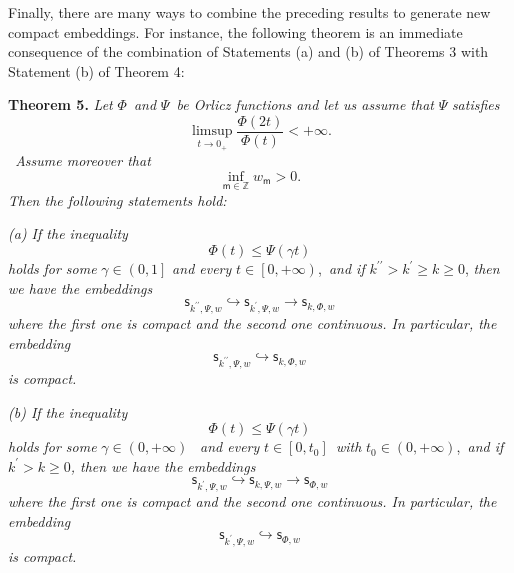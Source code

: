 \documentclass{article}
\begin{document}
\bigskip

Finally, there are many ways to combine the preceding results to generate
new compact embeddings. For instance, the following theorem is an immediate
consequence of the combination of Statements (a) and (b) of Theorems 3 with
Statement (b) of Theorem 4:

\bigskip

\textbf{Theorem 5. }\textit{Let }$\Phi $\textit{\ and }$\Psi $\textit{\ be
Orlicz functions and let us assume that }$\Psi $ \textit{satisfies}%
\begin{equation*}
\limsup_{t\rightarrow 0_{+}}\frac{\Phi \left( 2t\right) }{\Phi \left(
t\right) }<+\infty .
\end{equation*}%
\textit{\ Assume moreover that}%
\begin{equation*}
\inf_{\mathsf{m}\in \mathbb{Z}}w_{\mathsf{m}}>0\text{.}
\end{equation*}%
\textit{Then the following statements hold:}

\textit{(a) If the inequality}%
\begin{equation*}
\Phi (t)\leq \Psi (\gamma t)
\end{equation*}%
\textit{holds} \textit{for some }$\gamma \in \left( 0,1\right] $ \textit{and
every }$t\in \left[ 0,+\infty \right) $,\textit{\ and if }$k^{\prime \prime
}>k^{\prime }\geq k\geq 0$, \textit{then we have the embeddings}%
\begin{equation*}
\mathsf{s}_{k^{\prime \prime },\Psi ,w}\hookrightarrow \mathsf{s}_{k^{\prime
},\Psi ,w}\rightarrow \mathsf{s}_{k,\Phi ,w}
\end{equation*}%
\textit{where the first one is compact and the second one continuous. In
particular, the embedding}%
\begin{equation*}
\mathsf{s}_{k^{\prime \prime },\Psi ,w}\hookrightarrow \mathsf{s}_{k,\Phi ,w}
\end{equation*}%
\textit{is compact.}

\textit{(b) If the inequality}%
\begin{equation*}
\Phi (t)\leq \Psi (\gamma t)
\end{equation*}%
\textit{holds} \textit{for some }$\gamma \in \left( 0,+\infty \right) $%
\textit{\ and every }$t\in \left[ 0,t_{0}\right] $\textit{\ with }$t_{0}\in
\left( 0,+\infty \right) $,\textit{\ and if }$k^{\prime }>k\geq 0$\textit{,
then we have the embeddings}%
\begin{equation*}
\mathsf{s}_{k^{\prime },\Psi ,w}\hookrightarrow \mathsf{s}_{k,\Psi
,w}\rightarrow \mathsf{s}_{\Phi ,w}
\end{equation*}%
\textit{where the first one is compact and the second one continuous. In
particular, the embedding}%
\begin{equation*}
\mathsf{s}_{k^{\prime },\Psi ,w}\hookrightarrow \mathsf{s}_{\Phi ,w}
\end{equation*}%
\textit{is compact.}
\end{document}

